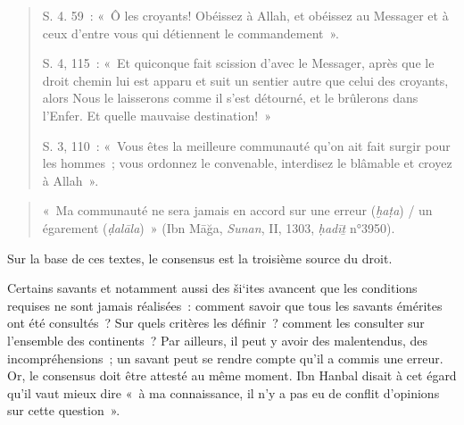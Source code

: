 \begin{quote}
    

S. 4. 59~: «~Ô les croyants! Obéissez à Allah, et obéissez au Messager
et à ceux d'entre vous qui détiennent le commandement~».

S. 4, 115~: «~Et quiconque fait scission d'avec le Messager, après que
le droit chemin lui est apparu et suit un sentier autre que celui des
croyants, alors Nous le laisserons comme il s'est détourné, et le
brûlerons dans l'Enfer. Et quelle mauvaise destination!~»

S. 3, 110~: «~Vous êtes la meilleure communauté qu'on ait fait surgir
pour les hommes~; vous ordonnez le convenable, interdisez le blâmable et
croyez à Allah~».
\end{quote}

\begin{quote}
    

«~Ma communauté ne sera jamais en accord sur une erreur (\emph{ḫaṭa}) /
un égarement (\emph{ḍalāla})~» (Ibn Māğa, \emph{Sunan}, II, 1303,
\emph{ḥadīṯ} n°3950).
\end{quote}
Sur la base de ces textes, le consensus est la troisième source du
droit.


Certains savants et notamment aussi des ši`ites avancent que les
conditions requises ne sont jamais réalisées~: comment savoir que tous
les savants émérites ont été consultés~? Sur quels critères les
définir~? comment les consulter sur l'ensemble des continents~? Par
ailleurs, il peut y avoir des malentendus, des incompréhensions~; un
savant peut se rendre compte qu'il a commis une erreur. Or, le consensus
doit être attesté au même moment. Ibn Hanbal disait à cet égard qu'il
vaut mieux dire «~à ma connaissance, il n'y a pas eu de conflit
d'opinions sur cette question~».

